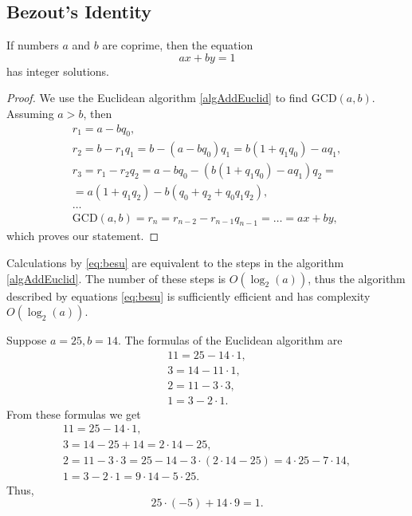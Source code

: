 \subsection{Bezout's Identity}

\begin{theorem}[Bezout]
\label{thm:besu}
If numbers $a$ and $b$ are coprime, then the equation 
\[
ax + by = 1
\] 
has integer solutions.
\begin{proof}
We use the Euclidean algorithm \ref{algAddEuclid} to find
$\mbox{GCD}\left(a, b\right)$.
Assuming $a > b$, then
\begin{eqnarray}
r_1 = a - b q_0, 
\nonumber \\
r_2 = b - r_1 q_1 = b - (a - b q_0)q_1 = b(1+q_1 q_0) - a q_1, 
\nonumber \\
r_3 = r_1 - r_2 q_2 = a - b q_0 - \left(b(1+q_1 q_0) - a q_1\right)q_2
= \nonumber \\
= a(1+q_1 q_2) - b(q_0 + q_2 + q_0 q_1 q_2),
\nonumber \\
\dots
\nonumber \\
\mbox{GCD}\left(a, b\right) = r_n = r_{n-2} - r_{n-1} q_{n-1} = \dots
= a x + b y, 
\label{eq:besu}
\end{eqnarray}
which proves our statement.
\end{proof}
\end{theorem}

\begin{remark}
\label{rem:besu}
Calculations by \eqref{eq:besu} are equivalent to the steps in the algorithm
\ref{algAddEuclid}. The number of these steps is $O\left(\log_2(a)\right)$, thus
the algorithm described by equations \eqref{eq:besu} is sufficiently efficient
and has complexity $O\left(\log_2(a)\right)$.
\end{remark}

\begin{example}
\label{ex:besu}
Suppose $a = 25, b = 14$. The formulas of the Euclidean algorithm are
\begin{eqnarray}
11 = 25 - 14 \cdot 1,
\nonumber \\
3 = 14 - 11 \cdot 1,
\nonumber \\
2 = 11 - 3 \cdot 3,
\nonumber \\
1 = 3 - 2 \cdot 1.
\nonumber
\end{eqnarray}
From these formulas we get
\begin{eqnarray}
11 = 25 - 14 \cdot 1,
\nonumber \\
3 = 14 - 25 + 14 = 2 \cdot 14 - 25,
\nonumber \\
2 = 11 - 3 \cdot 3 = 25 - 14 - 3 \cdot (2 \cdot 14 - 25) = 4 \cdot 25 - 7 \cdot
14,
\nonumber \\
1 = 3 - 2 \cdot 1 = 9 \cdot 14 - 5 \cdot 25.
\nonumber
\end{eqnarray}
Thus,
\[
25 \cdot (-5)  + 14 \cdot 9 = 1.
\]
\end{example}